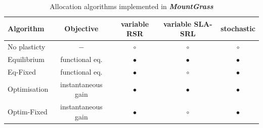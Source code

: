 \documentclass[a4paper,twoside, justified,marginals=raggedright, nobib]{tufte-handout}
\newcommand{\model}{\textit{\textbf{MountGrass }}}
\begin{document}
\begin{table}
\caption{Allocation algorithms implemented in \model} 
\label{table:alloc_algo}
\begin{tabular}{l|c|c c c}
Algorithm & Objective & variable RSR & variable SLA-SRL & stochastic \\ 
\hline 
No plasticty & $-$ & $\circ$ & $\circ$ & $\circ$ \\
Equilibrium & functional eq. & $\bullet$ & $\bullet$ & $\bullet$ \\
Eq-Fixed & functional eq. & $\bullet$ & $\circ$ & $\bullet$ \\
Optimisation & instantaneous gain & $\bullet$ & $\bullet$ & $\bullet$ \\
Optim-Fixed & instantaneous gain & $\bullet$ & $\circ$ & $\bullet$ \\
\end{tabular} 
\vspace*{0.5cm}
\end{table}
\end{document}
